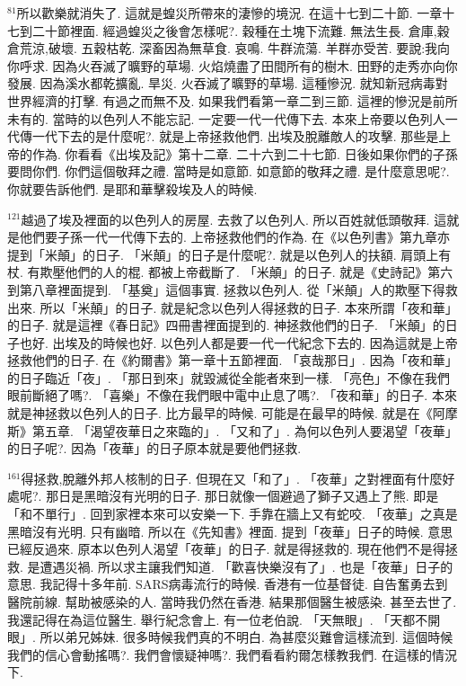 \documentclass{book}
\begin{document}
$^{81}$所以歡樂就消失了.
這就是蝗災所帶來的淒慘的境況.
在這十七到二十節.
一章十七到二十節裡面.
經過蝗災之後會怎樣呢?.
穀種在土塊下流難.
無法生長.
倉庫,穀倉荒涼,破壞.
五穀枯乾.
深畜因為無草食.
哀鳴.
牛群流蕩.
羊群亦受苦.
要說:我向你呼求.
因為火吞滅了曠野的草場.
火焰燒盡了田間所有的樹木.
田野的走秀亦向你發展.
因為溪水都乾擴亂.
旱災.
火吞滅了曠野的草場.
這種慘況.
就知新冠病毒對世界經濟的打擊.
有過之而無不及.
如果我們看第一章二到三節.
這裡的慘況是前所未有的.
當時的以色列人不能忘記.
一定要一代一代傳下去.
本來上帝要以色列人一代傳一代下去的是什麼呢?.
就是上帝拯救他們.
出埃及脫離敵人的攻擊.
那些是上帝的作為.
你看看《出埃及記》第十二章.
二十六到二十七節.
日後如果你們的子孫要問你們.
你們這個敬拜之禮.
當時是如意節.
如意節的敬拜之禮.
是什麼意思呢?.
你就要告訴他們.
是耶和華擊殺埃及人的時候.

$^{121}$越過了埃及裡面的以色列人的房屋.
去救了以色列人.
所以百姓就低頭敬拜.
這就是他們要子孫一代一代傳下去的.
上帝拯救他們的作為.
在《以色列書》第九章亦提到「米顛」的日子.
「米顛」的日子是什麼呢?.
就是以色列人的扶額.
肩頭上有杖.
有欺壓他們的人的棍.
都被上帝截斷了.
「米顛」的日子.
就是《史詩記》第六到第八章裡面提到.
「基奠」這個事實.
拯救以色列人.
從「米顛」人的欺壓下得救出來.
所以「米顛」的日子.
就是紀念以色列人得拯救的日子.
本來所謂「夜和華」的日子.
就是這裡《春日記》四冊書裡面提到的.
神拯救他們的日子.
「米顛」的日子也好.
出埃及的時候也好.
以色列人都是要一代一代紀念下去的.
因為這就是上帝拯救他們的日子.
在《約爾書》第一章十五節裡面.
「哀哉那日」.
因為「夜和華」的日子臨近「夜」.
「那日到來」就毀滅從全能者來到一樣.
「亮色」不像在我們眼前斷絕了嗎?.
「喜樂」不像在我們眼中電中止息了嗎?.
「夜和華」的日子.
本來就是神拯救以色列人的日子.
比方最早的時候.
可能是在最早的時候.
就是在《阿摩斯》第五章.
「渴望夜華日之來臨的」.
「又和了」.
為何以色列人要渴望「夜華」的日子呢?.
因為「夜華」的日子原本就是要他們拯救.

$^{161}$得拯救,脫離外邦人核制的日子.
但現在又「和了」.
「夜華」之對裡面有什麼好處呢?.
那日是黑暗沒有光明的日子.
那日就像一個避過了獅子又遇上了熊.
即是「和不單行」.
回到家裡本來可以安樂一下.
手靠在牆上又有蛇咬.
「夜華」之真是黑暗沒有光明.
只有幽暗.
所以在《先知書》裡面.
提到「夜華」日子的時候.
意思已經反過來.
原本以色列人渴望「夜華」的日子.
就是得拯救的.
現在他們不是得拯救.
是遭遇災禍.
所以求主讓我們知道.
「歡喜快樂沒有了」.
也是「夜華」日子的意思.
我記得十多年前.
SARS病毒流行的時候.
香港有一位基督徒.
自告奮勇去到醫院前線.
幫助被感染的人.
當時我仍然在香港.
結果那個醫生被感染.
甚至去世了.
我還記得在為這位醫生.
舉行紀念會上.
有一位老伯說.
「天無眼」.
「天都不開眼」.
所以弟兄姊妹.
很多時候我們真的不明白.
為甚麼災難會這樣流到.
這個時候我們的信心會動搖嗎?.
我們會懷疑神嗎?.
我們看看約爾怎樣教我們.
在這樣的情況下.
\end{document}
